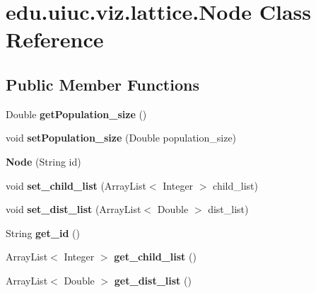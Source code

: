 \hypertarget{classedu_1_1uiuc_1_1viz_1_1lattice_1_1_node}{}\section{edu.\+uiuc.\+viz.\+lattice.\+Node Class Reference}
\label{classedu_1_1uiuc_1_1viz_1_1lattice_1_1_node}
\subsection*{Public Member Functions}
\begin{DoxyCompactItemize}
\item 
\mbox{\label{classedu_1_1uiuc_1_1viz_1_1lattice_1_1_node_af21dc7081d5c36d2070b784b2a951b04}} 
Double {\bfseries get\+Population\+\_\+size} ()
\item 
\mbox{\label{classedu_1_1uiuc_1_1viz_1_1lattice_1_1_node_a0d879e039fbf1f637e5872ca3bd42fd1}} 
void {\bfseries set\+Population\+\_\+size} (Double population\+\_\+size)
\item 
\mbox{\label{classedu_1_1uiuc_1_1viz_1_1lattice_1_1_node_adf772043e374666acdf74fc3da434cf4}} 
{\bfseries Node} (String id)
\item 
\mbox{\label{classedu_1_1uiuc_1_1viz_1_1lattice_1_1_node_a885613c3fab1ed43700eba5938b2ac89}} 
void {\bfseries set\+\_\+child\+\_\+list} (Array\+List$<$ Integer $>$ child\+\_\+list)
\item 
\mbox{\label{classedu_1_1uiuc_1_1viz_1_1lattice_1_1_node_a1854fff4fe64ae6b6b7cad9dab43b8d4}} 
void {\bfseries set\+\_\+dist\+\_\+list} (Array\+List$<$ Double $>$ dist\+\_\+list)
\item 
\mbox{\label{classedu_1_1uiuc_1_1viz_1_1lattice_1_1_node_a89d588ba2323dcd0cbe708bef5518626}} 
String {\bfseries get\+\_\+id} ()
\item 
\mbox{\label{classedu_1_1uiuc_1_1viz_1_1lattice_1_1_node_a9c245a3b575c011d79bfd1769162928d}} 
Array\+List$<$ Integer $>$ {\bfseries get\+\_\+child\+\_\+list} ()
\item 
\mbox{\label{classedu_1_1uiuc_1_1viz_1_1lattice_1_1_node_a4386e78cf2ecb5b06c2eab8a59299d68}} 
Array\+List$<$ Double $>$ {\bfseries get\+\_\+dist\+\_\+list} ()
\end{DoxyCompactItemize}
